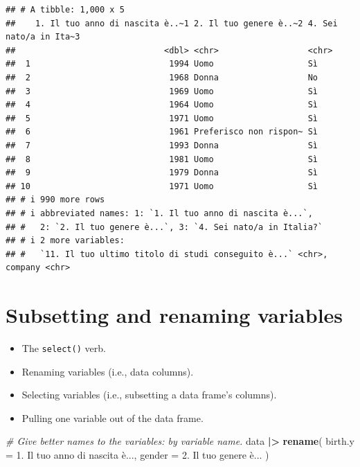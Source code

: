 \documentclass[
]{book}
\newenvironment{Shaded}{\begin{snugshade}}{\end{snugshade}}
\newcommand{\AttributeTok}[1]{\textcolor[rgb]{0.13,0.29,0.53}{#1}}
\newcommand{\CommentTok}[1]{\textcolor[rgb]{0.56,0.35,0.01}{\textit{#1}}}
\newcommand{\FunctionTok}[1]{\textcolor[rgb]{0.13,0.29,0.53}{\textbf{#1}}}
\newcommand{\NormalTok}[1]{#1}
\newcommand{\SpecialCharTok}[1]{\textcolor[rgb]{0.81,0.36,0.00}{\textbf{#1}}}
\newcommand{\StringTok}[1]{\textcolor[rgb]{0.31,0.60,0.02}{#1}}
\providecommand{\tightlist}{%
  \setlength{\itemsep}{0pt}\setlength{\parskip}{0pt}}
\begin{document}
\begin{verbatim}
## # A tibble: 1,000 x 5
##    1. Il tuo anno di nascita è..~1 2. Il tuo genere è..~2 4. Sei nato/a in Ita~3
##                              <dbl> <chr>                  <chr>                 
##  1                            1994 Uomo                   Sì                    
##  2                            1968 Donna                  No                    
##  3                            1969 Uomo                   Sì                    
##  4                            1964 Uomo                   Sì                    
##  5                            1971 Uomo                   Sì                    
##  6                            1961 Preferisco non rispon~ Sì                    
##  7                            1993 Donna                  Sì                    
##  8                            1981 Uomo                   Sì                    
##  9                            1979 Donna                  Sì                    
## 10                            1971 Uomo                   Sì                    
## # i 990 more rows
## # i abbreviated names: 1: `1. Il tuo anno di nascita è...`,
## #   2: `2. Il tuo genere è...`, 3: `4. Sei nato/a in Italia?`
## # i 2 more variables:
## #   `11. Il tuo ultimo titolo di studi conseguito è...` <chr>, company <chr>
\end{verbatim}

\hypertarget{subsetting-and-renaming-variables}{%
\section{Subsetting and renaming variables}\label{subsetting-and-renaming-variables}}

\begin{itemize}
\tightlist
\item
  The \texttt{select()} verb.
\item
  Renaming variables (i.e., data columns).
\item
  Selecting variables (i.e., subsetting a data frame's columns).
\item
  Pulling one variable out of the data frame.
\end{itemize}

\begin{Shaded}
\begin{Highlighting}[]
\CommentTok{\# Give better names to the variables: by variable name.}
\NormalTok{data }\SpecialCharTok{|\textgreater{}} 
  \FunctionTok{rename}\NormalTok{(}
    \AttributeTok{birth.y =} \StringTok{\textasciigrave{}}\AttributeTok{1. Il tuo anno di nascita è...}\StringTok{\textasciigrave{}}\NormalTok{,}
    \AttributeTok{gender =} \StringTok{\textasciigrave{}}\AttributeTok{2. Il tuo genere è...}\StringTok{\textasciigrave{}}
\NormalTok{  )}
\end{Highlighting}
\end{Shaded}
\end{document}
